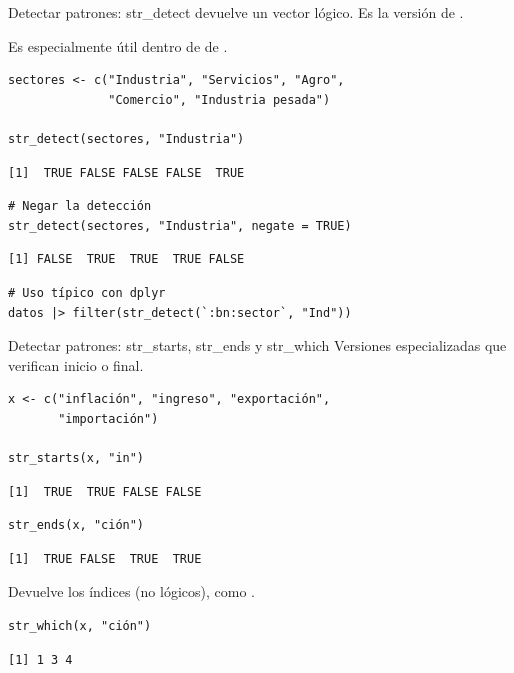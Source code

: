 \documentclass[8pt]{beamer}
\begin{document}
\begin{frame}[fragile]{Detectar patrones: str\_detect}
	 devuelve un vector lógico. Es la versión  de .
	
	Es especialmente útil dentro de  de .
\begin{lstlisting}[style=RScript]
sectores <- c("Industria", "Servicios", "Agro",
              "Comercio", "Industria pesada")

str_detect(sectores, "Industria")
\end{lstlisting}
\begin{lstlisting}[style=RConsole]
[1]  TRUE FALSE FALSE FALSE  TRUE
\end{lstlisting}
\begin{lstlisting}[style=RScript]
# Negar la detección
str_detect(sectores, "Industria", negate = TRUE)
\end{lstlisting}
\begin{lstlisting}[style=RConsole]
[1] FALSE  TRUE  TRUE  TRUE FALSE
\end{lstlisting}
\begin{lstlisting}[style=RScript]
# Uso típico con dplyr
datos |> filter(str_detect(`:bn:sector`, "Ind"))
\end{lstlisting}
\end{frame}




\begin{frame}[fragile]{Detectar patrones: str\_starts, str\_ends y str\_which}
	Versiones especializadas que verifican inicio o final.
\begin{lstlisting}[style=RScript]
x <- c("inflación", "ingreso", "exportación",
       "importación")

str_starts(x, "in")
\end{lstlisting}
\begin{lstlisting}[style=RConsole]
[1]  TRUE  TRUE FALSE FALSE
\end{lstlisting}
\begin{lstlisting}[style=RScript]
str_ends(x, "ción")
\end{lstlisting}
\begin{lstlisting}[style=RConsole]
[1]  TRUE FALSE  TRUE  TRUE
\end{lstlisting}

	Devuelve los índices (no lógicos), como .
\begin{lstlisting}[style=RScript]
str_which(x, "ción")
\end{lstlisting}
\begin{lstlisting}[style=RConsole]
[1] 1 3 4
\end{lstlisting}
\end{frame}
\end{document}
